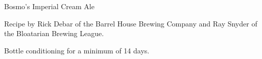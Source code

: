 \begin{recipe}{Bosmo's Imperial Cream Ale}

\begin{aboutblock}
Recipe by Rick Debar of the Barrel House Brewing Company and Ray Snyder of the
Bloatarian Brewing League.
\end{aboutblock}


\begin{methodandtiming}

\begin{mashsteps}
\end{mashsteps}

\begin{fermentationsteps}
\end{fermentationsteps}

\begin{directions}
Bottle conditioning for a minimum of 14 days.
\end{directions}

\end{methodandtiming}

\recipebreak

\begin{ingredientsblock}

\begin{malts}
\end{malts}

\begin{hops}
\end{hops}


\end{ingredientsblock}

\end{recipe}

